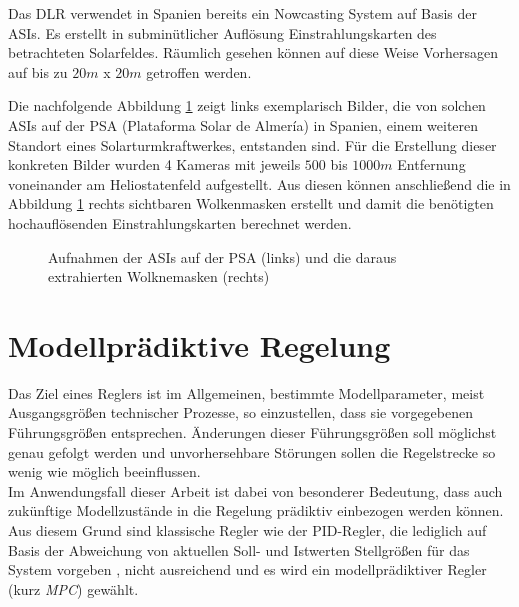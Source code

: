 Das DLR verwendet in Spanien bereits ein Nowcasting System auf Basis der ASIs.
Es erstellt in subminütlicher Auflösung Einstrahlungskarten des betrachteten Solarfeldes.
Räumlich gesehen können auf diese Weise Vorhersagen auf bis zu $20m$ x $20m$ getroffen werden. \cite[S.13]{Samu}\cite{DLRNowcasting}

Die nachfolgende Abbildung \ref{fig_Nowcasting_Kamerabilder} zeigt links exemplarisch Bilder, die von solchen ASIs auf der PSA (Plataforma Solar de Almería) in Spanien, einem weiteren Standort eines Solarturmkraftwerkes, entstanden sind.
Für die Erstellung dieser konkreten Bilder wurden 4 Kameras mit jeweils $500$ bis $1000m$ Entfernung voneinander am Heliostatenfeld aufgestellt.
Aus diesen können anschließend die in Abbildung \ref{fig_Nowcasting_Kamerabilder} rechts sichtbaren Wolkenmasken erstellt und damit die benötigten hochauflösenden Einstrahlungskarten berechnet werden. \cite{DLRNowcasting}

\begin{figure}[h!]
    \centering
    \setlength{\fboxsep}{1pt}
    \setlength{\fboxrule}{1pt}
\caption[Aufnahmen der ASIs auf der PSA  und die daraus extrahierten Wolknemaske]{Aufnahmen der ASIs auf der PSA (links) und die daraus extrahierten Wolknemasken (rechts) \cite{DLRNowcasting}}
    \label{fig_Nowcasting_Kamerabilder}
\end{figure}


\section{Modellprädiktive Regelung} \label{sec_ModellprädiktiveRegelung}
Das Ziel eines Reglers ist im Allgemeinen, bestimmte Modellparameter, meist Ausgangsgrößen technischer Prozesse, so einzustellen, dass sie vorgegebenen Führungsgrößen entsprechen.
Änderungen dieser Führungsgrößen soll möglichst genau gefolgt werden und unvorhersehbare Störungen sollen die Regelstrecke so wenig wie möglich beeinflussen. \cite{Abel} \\
Im Anwendungsfall dieser Arbeit ist dabei von besonderer Bedeutung, dass auch zukünftige Modellzustände in die Regelung prädiktiv einbezogen werden können.
Aus diesem Grund sind klassische Regler wie der PID-Regler, die lediglich auf Basis der Abweichung von aktuellen Soll- und Istwerten Stellgrößen für das System vorgeben \cite[S.408]{Lunze}, nicht ausreichend und es wird ein modellprädiktiver Regler (kurz \textit{MPC}) gewählt.

